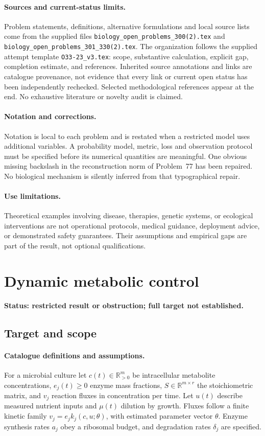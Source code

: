 \documentclass[11pt]{article}
\begin{document}
\paragraph{Sources and current-status limits.}
Problem statements, definitions, alternative formulations and local source lists
come from the supplied files
\texttt{biology\_open\_problems\_300(2).tex} and
\texttt{biology\_open\_problems\_301\_330(2).tex}.
The organization follows the supplied attempt template
\texttt{O33-23\_v3.tex}: scope, substantive calculation, explicit gap,
completion estimate, and references. Inherited source annotations and links are
catalogue provenance, not evidence that every link or current open status has
been independently rechecked. Selected methodological references appear at the
end. No exhaustive literature or novelty audit is claimed.

\paragraph{Notation and corrections.}
Notation is local to each problem and is restated when a restricted model uses
additional variables. A probability model, metric, loss and observation protocol
must be specified before its numerical quantities are meaningful. One obvious
missing backslash in the reconstruction norm of Problem~77 has been repaired.
No biological mechanism is silently inferred from that typographical repair.

\paragraph{Use limitations.}
Theoretical examples involving disease, therapies, genetic systems, or ecological
interventions are not operational protocols, medical guidance, deployment advice,
or demonstrated safety guarantees. Their assumptions and empirical gaps are part
of the result, not optional qualifications.


\section*{Dynamic metabolic control}
\label{prob:052}
\noindent\textbf{Status: restricted result or obstruction; full target not established.}
\subsection{Target and scope}
\paragraph{Catalogue definitions and assumptions.}
For a microbial culture let $c(t)\in\mathbb{R}_{>0}^m$ be intracellular metabolite concentrations, $e_j(t)\ge0$ enzyme mass fractions, $S\in\mathbb{R}^{m\times r}$ the stoichiometric matrix, and $v_j$ reaction fluxes in concentration per time. Let $u(t)$ describe measured nutrient inputs and $\mu(t)$ dilution by growth. Fluxes follow a finite kinetic family $v_j=e_jk_j(c,u;\theta)$, with estimated parameter vector $\theta$. Enzyme synthesis rates $a_j$ obey a ribosomal budget, and degradation rates $\delta_j$ are specified.
\end{document}

